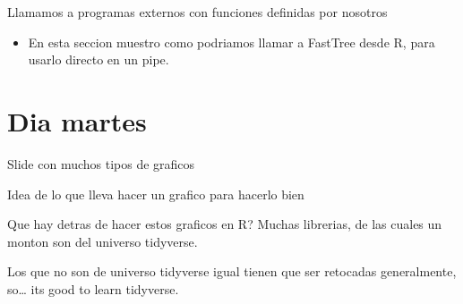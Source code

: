 \documentclass[ignorenonframetext,]{beamer}
\providecommand{\tightlist}{%
  \setlength{\itemsep}{0pt}\setlength{\parskip}{0pt}}
\begin{document}
\begin{frame}{Llamamos a programas externos con funciones definidas por
nosotros}
\protect\hypertarget{llamamos-a-programas-externos-con-funciones-definidas-por-nosotros}{}

\begin{itemize}
\tightlist
\item
  En esta seccion muestro como podriamos llamar a FastTree desde R, para
  usarlo directo en un pipe.
\end{itemize}

\end{frame}

\hypertarget{dia-martes}{%
\section{Dia martes}\label{dia-martes}}

\begin{frame}{Slide con muchos tipos de graficos}
\protect\hypertarget{slide-con-muchos-tipos-de-graficos}{}

\end{frame}

\begin{frame}{Idea de lo que lleva hacer un grafico para hacerlo bien}
\protect\hypertarget{idea-de-lo-que-lleva-hacer-un-grafico-para-hacerlo-bien}{}

\end{frame}

\begin{frame}{Que hay detras de hacer estos graficos en R? Muchas
librerias, de las cuales un monton son del universo tidyverse.}
\protect\hypertarget{que-hay-detras-de-hacer-estos-graficos-en-r-muchas-librerias-de-las-cuales-un-monton-son-del-universo-tidyverse.}{}

\end{frame}

\begin{frame}{Los que no son de universo tidyverse igual tienen que ser
retocadas generalmente, so\ldots{} its good to learn tidyverse.}
\protect\hypertarget{los-que-no-son-de-universo-tidyverse-igual-tienen-que-ser-retocadas-generalmente-so-its-good-to-learn-tidyverse.}{}

\end{frame}
\end{document}
